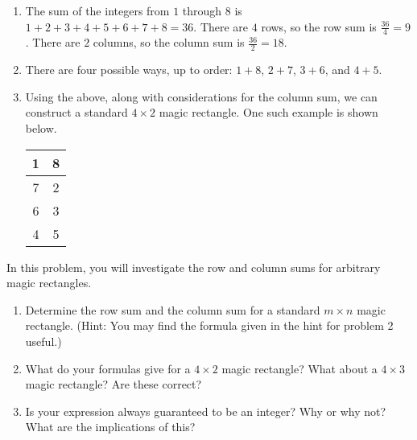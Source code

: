 \documentclass[11pt]{article}
\renewenvironment{problem}{\begin{problems}}{\end{problems}\vspace{5pt}}
\begin{document}
\begin{solution}
\begin{enumerate}[label=(\alph*)]
\item The sum of the integers from $1$ through $8$ is $1+2+3+4+5+6+7+8=36$. There are $4$ rows, so the
row sum is $\frac{36}{4} = \boxed{9}$. There are $2$ columns, so the column sum is $\frac{36}{2} = \boxed{18}$.

\item There are four possible ways, up to order: $1+8$, $2+7$, $3+6$, and $4+5$.

\item Using the above, along with considerations for the column sum, we can construct a standard $4 \times 2$
magic rectangle. One such example is shown below.
\begin{center}
\begin{tabular}{|c|c|}
\hline
1 & 8 \\ \hline
7 & 2 \\ \hline
6 & 3 \\ \hline
4 & 5 \\ \hline
\end{tabular}
\end{center}
\end{enumerate}
\end{solution}


\begin{problem}[6=3+2+1 points]
In this problem, you will investigate the row and column sums for arbitrary magic rectangles.
\begin{enumerate}[label=(\alph*)]
\item Determine the row sum and the column sum for a standard $m \times n$ magic rectangle.
(Hint: You may find the formula given in the hint for problem 2 useful.)

\item What do your formulas give for a $4 \times 2$ magic rectangle? What about a $4 \times 3$ magic rectangle?
Are these correct?

\item Is your expression always guaranteed to be an integer? Why or why not? What are the implications of this?
\end{enumerate}
\end{problem}
\end{document}
